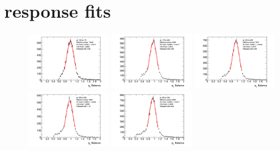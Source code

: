 \section{\zjets response fits \label{sec:appendix:responsefits}}

\begin{figure}[htb!]
    \centering
    \includegraphics[width=0.31\textwidth]{plots/insitu/fits_data_zee_nominal/Zeejet_Nominal_Bin2.png}
    \includegraphics[width=0.31\textwidth]{plots/insitu/fits_data_zee_nominal/Zeejet_Nominal_Bin3.png}
    \includegraphics[width=0.31\textwidth]{plots/insitu/fits_data_zee_nominal/Zeejet_Nominal_Bin4.png}
    \includegraphics[width=0.31\textwidth]{plots/insitu/fits_data_zee_nominal/Zeejet_Nominal_Bin5.png}
    \includegraphics[width=0.31\textwidth]{plots/insitu/fits_data_zee_nominal/Zeejet_Nominal_Bin6.png}

\end{figure}
